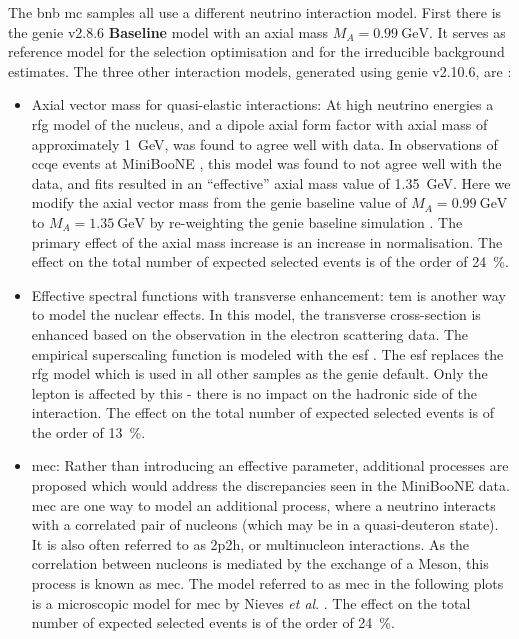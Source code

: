 The \gls{bnb} \gls{mc} samples all use a different neutrino interaction model. First there is the \gls{genie} v2.8.6 \textbf{Baseline} model with an axial mass $M_A=\SI{0.99}{\giga\electronvolt}$. It serves as reference model for the selection optimisation and for the irreducible background estimates. The three other interaction models, generated using \gls{genie} v2.10.6, are \cite{MicroBooNECCInclPN}:
\begin{itemize}
    \item Axial vector mass for quasi-elastic interactions: At high neutrino energies a \gls{rfg} model of the nucleus, and a dipole axial form factor with axial mass of approximately \SI{1}{\giga\electronvolt}, was found to agree well with data. In observations of \gls{ccqe} events at MiniBooNE \cite{AxialMassMiniBooNE}, this model was found to not agree well with the data, and fits resulted in an ``effective'' axial mass value of \SI{1.35}{\giga\electronvolt}. Here we modify the axial vector mass from the \gls{genie} baseline value of $M_A = \SI{0.99}{\giga\electronvolt}$ to $M_A = \SI{1.35}{\giga\electronvolt}$ by re-weighting the \gls{genie} baseline simulation \cite{GenieTools}. The primary effect of the axial mass increase is an increase in normalisation. The effect on the total number of expected selected events is of the order of \SI{24}{\percent}.
    \item Effective spectral functions with transverse enhancement: \gls{tem} \cite{CrossSectionModelTEM} is another way to model the nuclear effects. In this model, the transverse cross-section is enhanced based on the observation in the electron scattering data. The empirical superscaling function is modeled with the \gls{esf} \cite{CrossSectionModelESF}. The \gls{esf} replaces the \gls{rfg} model which is used in all other samples as the \gls{genie} default. Only the lepton is affected by this - there is no impact on the hadronic side of the interaction. The effect on the total number of expected selected events is of the order of \SI{13}{\percent}.
    \item \gls{mec}: Rather than introducing an effective parameter, additional processes are proposed which would address the discrepancies seen in the MiniBooNE data. \gls{mec} are one way to model an additional process, where a neutrino interacts with a correlated pair of nucleons (which may be in a quasi-deuteron state). It is also often referred to as 2p2h, or multinucleon interactions. As the correlation between nucleons is mediated by the exchange of a \gls{Meson}, this process is known as \gls{mec}. The model referred to as \gls{mec} in the following plots is a microscopic model for \gls{mec} by Nieves \emph{et al}. \cite{CrossSectionModelMEC}. The effect on the total number of expected selected events is of the order of \SI{24}{\percent}.
\end{itemize}
